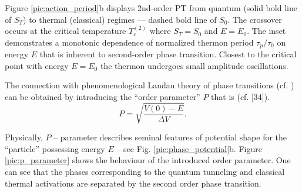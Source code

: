 \documentclass[aps, pre, preprint, groupedaddress, superscriptaddress, showkeys, showpacs] {revtex4-1}
\begin{document}
Figure \ref{pic:action_period}b displays 2nd-order PT from quantum (solid bold line of $S_T$) to thermal (classical) regimes --- dashed bold line of $S_0$.
The crossover occurs at the critical temperature $T_{c}^{(2)}$ where $S_T = S_0$ and {$E = E_0$}.
The inset demonstrates a monotonic dependence of normalized thermon period $\tau_p/\tau_0$ on energy $E$ that is inherent to second-order phase transition.
Closest to the critical point with energy $E=E_0$ the thermon undergoes small amplitude oscillations.

The connection with phenomenological Landau theory of phase transitions  (cf. \cite{Lif}) can be obtained by introducing the ``order parameter'' $P$ that is  (cf. [34]).
%
\begin{equation}
P = \sqrt{\dfrac{V(0) - E}{\Delta V}}.
\label{eq:p_parameter}
\end{equation}
%

Physically, $P$ -- parameter describes  seminal features of potential shape for the ``particle'' possessing energy $E$ -- see Fig. \ref{pic:phase_potential}b.
Figure \ref{pic:p_parameter} shows the behaviour of the introduced order parameter.
One can see that the phases corresponding to the quantum tunneling and classical thermal activations are separated by the second order phase transition.
\end{document}
